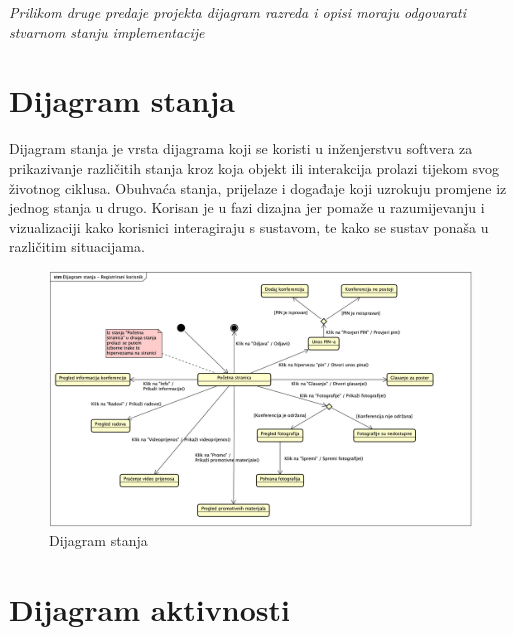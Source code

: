 			\textit{Prilikom druge predaje projekta dijagram razreda i opisi moraju odgovarati stvarnom stanju implementacije}
			
			
			
			\eject
		
		\section{Dijagram stanja}
			
			

			Dijagram stanja je vrsta dijagrama koji se koristi u inženjerstvu softvera za prikazivanje različitih stanja kroz koja objekt ili interakcija prolazi tijekom svog životnog ciklusa. Obuhvaća stanja, prijelaze i događaje koji uzrokuju promjene iz jednog stanja u drugo. Korisan je u fazi dizajna jer pomaže u razumijevanju i vizualizaciji kako korisnici interagiraju s sustavom, te kako se sustav ponaša u različitim situacijama.
			
			\begin{figure}[H]
				\includegraphics[scale=0.4]{dijagrami/dijagram_stanja.png} %
				\centering
				\caption{Dijagram stanja}
				\label{fig:promjene3}
			\end{figure}			
			
			
			\eject 
		
		\section{Dijagram aktivnosti}
			
